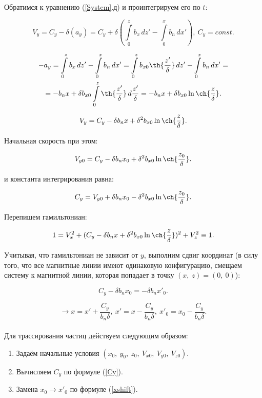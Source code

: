 \documentclass[12pt]{article}
\begin{document}
Обратимся к уравнению (\ref{System}.д) и проинтегрируем его по $t$: 

\begin{equation}
V_y = C_y - \delta(a_y) = C_y + \delta \left( \int\limits_0^z b_x\,dz' - \int\limits_0^x b_n\,dx' \right),\ C_y = const.
\end{equation}

\begin{gather*}
-a_y = \int\limits_0^z b_x\,dz' - \int\limits_0^x b_n\,dx' = \int\limits_0^z b_{x0} \th {\frac{z'}{\delta} } \,dz' - \int\limits_0^x b_n\,dx' = \\
= -b_nx + \delta b_{x0}\int\limits_0^z \th {\frac{z'}{\delta} }\,d \frac{z'}{\delta} = -b_nx + \delta b_{x0} \ln{ \ch {\frac{z}{\delta} }}.
\end{gather*}

\begin{equation}
V_y = C_y - \delta b_n x + \delta^2 b_{x0} \ln{ \ch {\frac{z}{\delta} }}.
\end{equation}

Начальная скорость при этом:

\begin{equation}
V_{y0} = C_y - \delta b_n x_0 + \delta^2 b_{x0} \ln{ \ch {\frac{z_0}{\delta} }}.
\end{equation}

и константа интегрирования равна:

\begin{equation}
C_y = V_{y0} + \delta b_n x_0 - \delta^2 b_{x0} \ln{ \ch {\frac{z_0}{\delta} }}.
\label{Cy}
\end{equation}

Перепишем гамильтониан:

\begin{gather}
1 = V^2_x + (C_y - \delta b_n x + \delta^2 b_{x0} \ln{ \ch {\frac{z}{\delta} }})^2 + V^2_z \equiv 1. 
\end{gather}

Учитывая, что гамильтониан не зависит от $y$, выполним сдвиг координат (в силу того, что все магнитные линии имеют одинаковую конфигурацию, смещаем систему к магнитной линии, которая попадает в точку $(x,\ z) = (0,\ 0)$): 

\begin{equation}
C_y - \delta b_n x_0 = - \delta b_n x'_0.
\end{equation}

\begin{equation}
\rightarrow x = x' + \frac{C_y}{b_n \delta},\ x' = x - \frac{C_y}{b_n \delta},\ x'_0 = x_0 - \frac{C_y}{b_n \delta}.
\label{xshift}
\end{equation}
\\
Для трассирования частиц действуем следующим образом:
\begin{enumerate}  
\item Задаём начальные условия $(x_0,\ y_0,\ z_0,\ V_{x0},\ V_{y0},\ V_{z0})$.
\item Вычисляем $C_y$ по формуле (\ref{Cy}). 
\item Замена $x_0 \rightarrow x'_0$ по формуле (\ref{xshift}).
\end{enumerate}
\end{document}
